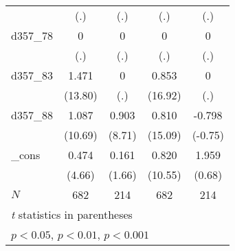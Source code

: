 {\begin{tabular}{l*{4}{c}}
            &         (.)         &         (.)         &         (.)         &         (.)         \\
[1em]
d357\_78     &           0         &           0         &           0         &           0         \\
            &         (.)         &         (.)         &         (.)         &         (.)         \\
[1em]
d357\_83     &       1.471\sym{***}&           0         &       0.853\sym{***}&           0         \\
            &     (13.80)         &         (.)         &     (16.92)         &         (.)         \\
[1em]
d357\_88     &       1.087\sym{***}&       0.903\sym{***}&       0.810\sym{***}&      -0.798         \\
            &     (10.69)         &      (8.71)         &     (15.09)         &     (-0.75)         \\
[1em]
\_cons      &       0.474\sym{***}&       0.161         &       0.820\sym{***}&       1.959         \\
            &      (4.66)         &      (1.66)         &     (10.55)         &      (0.68)         \\
\hline
\(N\)       &         682         &         214         &         682         &         214         \\
\hline\hline
\multicolumn{5}{l}{\footnotesize \textit{t} statistics in parentheses}\\
\multicolumn{5}{l}{\footnotesize \sym{*} \(p<0.05\), \sym{**} \(p<0.01\), \sym{***} \(p<0.001\)}\\
\end{tabular}
}
